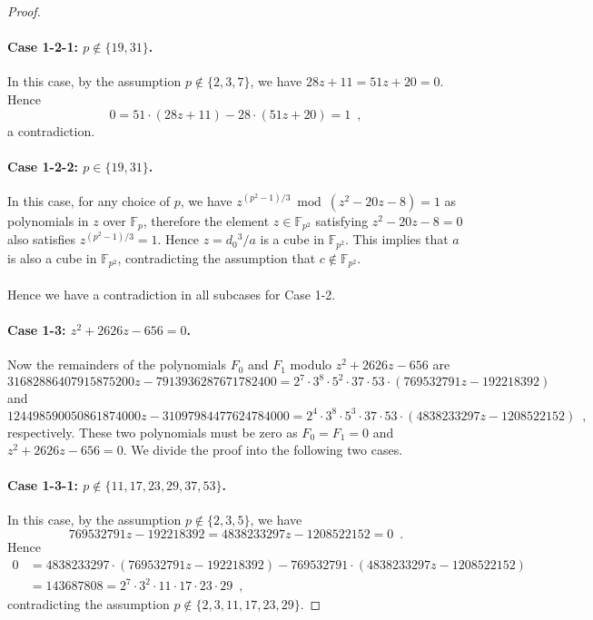 \documentclass{article}
\theoremstyle{definition}
\newcommand{\FF}{\mathbb{F}}
\begin{document}
\begin{proof}
\paragraph{Case 1-2-1: $p \not\in \{19,31\}$.}

In this case, by the assumption $p \not\in \{2,3,7\}$, we have $28z + 11 = 51z + 20 = 0$.
Hence
\[
0 = 51 \cdot (28 z + 11) - 28 \cdot (51 z + 20)
= 1 \enspace,
\]
a contradiction.

\paragraph{Case 1-2-2: $p \in \{19,31\}$.}

In this case, for any choice of $p$, we have $z^{(p^2 - 1) / 3} \bmod (z^2 - 20z - 8) = 1$ as polynomials in $z$ over $\FF_p$, therefore the element $z \in \FF_{p^2}$ satisfying $z^2 - 20z - 8 = 0$ also satisfies $z^{(p^2 - 1) / 3} = 1$.
Hence $z = d_0{}^3 / a$ is a cube in $\FF_{p^2}$.
This implies that $a$ is also a cube in $\FF_{p^2}$, contradicting the assumption that $c \not\in \FF_{p^2}$.

\paragraph{}

Hence we have a contradiction in all subcases for Case 1-2.

\paragraph{Case 1-3: $z^2 + 2626 z - 656 = 0$.}

Now the remainders of the polynomials $F_0$ and $F_1$ modulo $z^2 + 2626 z - 656$ are
\[
31682886407915875200 z - 7913936287671782400
= 2^7 \cdot 3^8 \cdot 5^2 \cdot 37 \cdot 53 \cdot (769532791 z - 192218392)
\]
and
\[
124498590050861874000 z - 31097984477624784000
= 2^4 \cdot 3^8 \cdot 5^3 \cdot 37 \cdot 53 \cdot (4838233297 z - 1208522152) \enspace,
\]
respectively.
These two polynomials must be zero as $F_0 = F_1 = 0$ and $z^2 + 2626 z - 656 = 0$.
We divide the proof into the following two cases.

\paragraph{Case 1-3-1: $p \not\in \{11,17,23,29,37,53\}$.}

In this case, by the assumption $p \not\in \{2,3,5\}$, we have
\[
769532791 z - 192218392
= 4838233297 z - 1208522152
= 0 \enspace.
\]
Hence
\[
\begin{split}
0 &= 4838233297 \cdot (769532791 z - 192218392) - 769532791 \cdot (4838233297 z - 1208522152) \\
&= 143687808
= 2^7 \cdot 3^2 \cdot 11 \cdot 17 \cdot 23 \cdot 29 \enspace,
\end{split}
\]
contradicting the assumption $p \not\in \{2,3,11,17,23,29\}$.


\end{proof}
\end{document}
